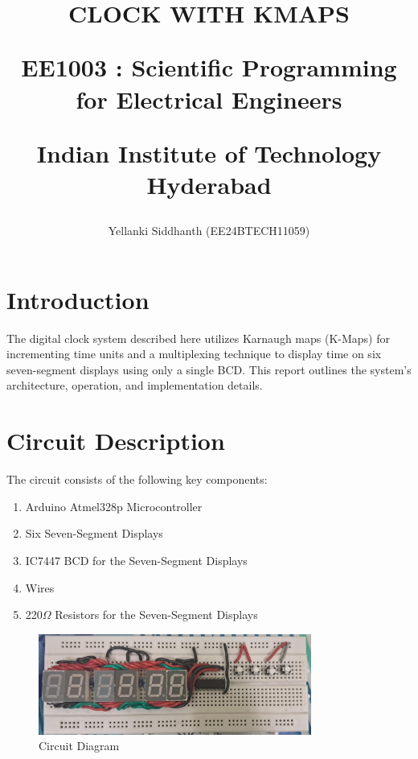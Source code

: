 \documentclass[journal]{IEEEtran}
\begin{document}
	
	
	\onecolumn
	
	\title{
		CLOCK WITH KMAPS
		
		\large{EE1003 : Scientific Programming for Electrical Engineers}
		
		Indian Institute of Technology Hyderabad
	}
	
	\author{Yellanki Siddhanth (EE24BTECH11059)}
	
	\maketitle
	
	\renewcommand{\thefigure}{\theenumi}
	\renewcommand{\thetable}{\theenumi}
	
	\section{Introduction}
	The digital clock system described here utilizes Karnaugh maps (K-Maps) for incrementing time units and a multiplexing technique to display time on six seven-segment displays using only a single BCD. This report outlines the system's architecture, operation, and implementation details.
	
	\section{Circuit Description}
	The circuit consists of the following key components:
	\begin{enumerate}
		\item Arduino Atmel328p Microcontroller
		\item Six Seven-Segment Displays
		\item IC7447 BCD for the Seven-Segment Displays
		\item Wires
		\item 220$\Omega$ Resistors for the Seven-Segment Displays
	\end{enumerate}
	
	\begin{figure}[h!]
	    \centering
	    \includegraphics[width=0.8\textwidth]{figs/circuit.jpeg}
	    \caption{Circuit Diagram}
	\end{figure}
	
\end{document}

